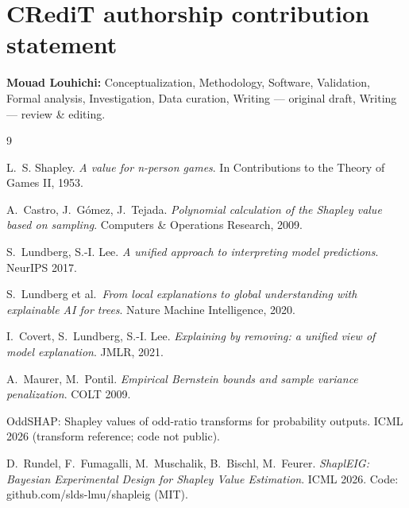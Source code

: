 \documentclass[preprint,12pt]{elsarticle}
\begin{document}
\section*{CRediT authorship contribution statement}
\textbf{Mouad Louhichi:} Conceptualization, Methodology, Software, Validation, Formal analysis, Investigation, Data curation, Writing --- original draft, Writing --- review \& editing.

\begin{thebibliography}{9}

 L.~S. Shapley. \emph{A value for n-person games}. In Contributions to the Theory of Games II, 1953.

 A.~Castro, J.~G\'omez, J.~Tejada. \emph{Polynomial calculation of the Shapley value based on sampling}. Computers \& Operations Research, 2009.

 S.~Lundberg, S.-I. Lee. \emph{A unified approach to interpreting model predictions}. NeurIPS 2017.

 S.~Lundberg et al.\ \emph{From local explanations to global understanding with explainable AI for trees}. Nature Machine Intelligence, 2020.

 I.~Covert, S.~Lundberg, S.-I. Lee. \emph{Explaining by removing: a unified view of model explanation}. JMLR, 2021.

 A.~Maurer, M.~Pontil. \emph{Empirical Bernstein bounds and sample variance penalization}. COLT 2009.

 OddSHAP: Shapley values of odd-ratio transforms for probability outputs. ICML 2026 (transform reference; code not public).

 D.~Rundel, F.~Fumagalli, M.~Muschalik, B.~Bischl, M.~Feurer. \emph{ShaplEIG: Bayesian Experimental Design for Shapley Value Estimation}. ICML 2026. Code: github.com/slds-lmu/shapleig (MIT).

\end{thebibliography}
\end{document}
